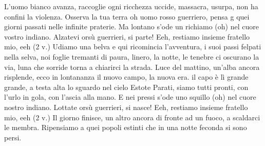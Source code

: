 \beginverse
L'uomo bianco avanza, raccoglie ogni ricchezza
uccide, massacra, usurpa, non ha confini la violenza.
Osserva la tua terra oh uomo rosso guerriero,
pensa g quei giorni passati nelle infinite praterie.
\endverse
\beginchorus
Ma lontano s'ode un richiamo (oh)
nel cuore vostro indiano.
Alzatevi orsù guerrieri, si parte!
Eeh, restiamo insieme fratello mio, eeh (2 v.)
\endchorus
\beginverse
Udiamo una belva e qui ricomincia l'avventura,
i suoi passi felpati nella selva, noi foglie tremanti di paura,
linero, la notte, le tenebre ci oscurano la via,
luna che sorride torna a chiarirci la strada.
Luce del mattino, un'alba ancora risplende,
ecco in lontananza il nuovo campo, la nuova era.
il capo è lì grande grande, a testa alta lo sguardo nel cielo
Estote Parati, siamo tutti pronti, con l'urlo in gola, con
l'ascia alla mano.
\endverse
\beginchorus
E nei pressi s'ode uno squillo (oh)
nel cuore nostro indiano.
Lottate orsù guerrieri, si nasce!
Eeh, restiamo insieme fratello mio, eeh (2 v.)
\endchorus
\beginverse
Il giorno finisce, un altro ancora
di fronte ad un fuoco, a scaldarci le membra.
Ripensiamo a quei popoli estinti
che in una notte feconda si sono persi.
\endverse
\endsong
